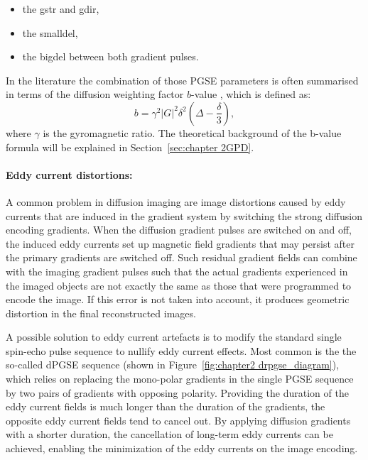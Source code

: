 \begin{itemize}
	\item the {\gls{gstr}} and {\gls{gdir}},
	\item the {\gls{smalldel}},
	\item the {\gls{bigdel}} between both gradient pulses.
\end{itemize}

In the literature the combination of those PGSE parameters is often summarised in terms of the diffusion weighting factor $b$-value \citep{LeBihan:1986}, which is defined as:
\begin{equation}
	b = \gamma^2|G|^2\delta^2(\Delta-\frac{\delta}{3}),
    \label{eq:bvalue}
\end{equation}
where $\gamma$ is the gyromagnetic ratio. The theoretical background of the b-value formula will be explained in Section~\ref{sec:chapter 2GPD}.


\paragraph{Eddy current distortions: } 
A common problem in diffusion imaging are image distortions caused by eddy currents that are induced in the gradient system by switching the strong diffusion encoding gradients. When the diffusion gradient pulses are switched on and off, the induced eddy currents set up magnetic field gradients that may persist after the primary gradients are switched off. Such residual gradient fields can combine with the imaging gradient pulses such that the actual gradients experienced in the imaged objects are not exactly the same as those that were programmed to encode the image. If this error is not taken into account, it produces geometric distortion in the final reconstructed images. 

A possible solution to eddy current artefacts is to modify the standard single spin-echo pulse sequence to nullify eddy current effects. Most common is the the so-called \gls{dPGSE} sequence\citep{Reese:2003} (shown in Figure~\ref{fig:chapter2 drpgse_diagram}), which relies on replacing the mono-polar gradients in the single PGSE sequence by two pairs of gradients with opposing polarity. Providing the duration of the eddy current fields is much longer than the duration of the gradients, the opposite eddy current fields tend to cancel out. By applying diffusion gradients with a shorter duration, the cancellation of long-term eddy currents can be achieved, enabling the minimization of the eddy currents on the image encoding.

